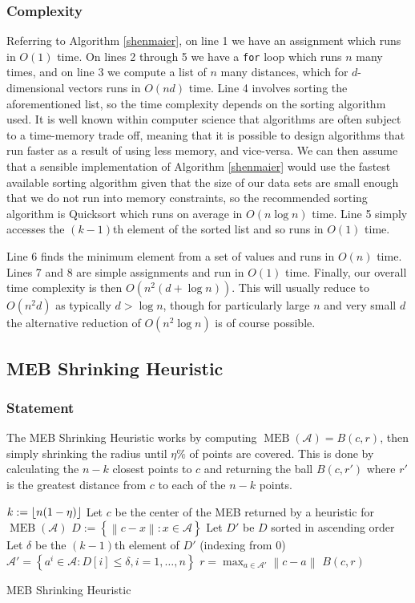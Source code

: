 \documentclass[11pt,twoside]{report}
\newcommand{\A}{\mathcal{A}} %
\newcommand{\norm}[1]{\left\lVert#1\right\rVert} %
\DeclareMathOperator{\MEB}{MEB}
\DeclarePairedDelimiter\floor{\lfloor}{\rfloor}
\theoremstyle{definition}
\numberwithin{theorem}{section}
\numberwithin{definition}{section}
\numberwithin{lemma}{section}
\numberwithin{proposition}{section}
\numberwithin{equation}{section}
\numberwithin{figure}{section}
\begin{document}
\subsubsection{Complexity}
Referring to Algorithm \ref{shenmaier}, on line 1 we have an assignment which runs in $O(1)$ time. On lines 2 through 5 we have a \texttt{for} loop which runs $n$ many times, and on line 3 we compute a list of $n$ many distances, which for $d$-dimensional vectors runs in $O(nd)$ time. Line 4 involves sorting the aforementioned list, so the time complexity depends on the sorting algorithm used. It is well known within computer science that algorithms are often subject to a time-memory trade off, meaning that it is possible to design algorithms that run faster as a result of using less memory, and vice-versa. We can then assume that a sensible implementation of Algorithm \ref{shenmaier} would use the fastest available sorting algorithm given that the size of our data sets are small enough that we do not run into memory constraints, so the recommended sorting algorithm is Quicksort \cite{hoare1962quicksort} which runs on average in $O(n\log n)$ time. Line 5 simply accesses the $(k-1)$th element of the sorted list and so runs in $O(1)$ time.

Line 6 finds the minimum element from a set of values and runs in $O(n)$ time. Lines 7 and 8 are simple assignments and run in $O(1)$ time. Finally, our overall time complexity is then $O(n^2(d+\log n))$. This will usually reduce to $O(n^2d)$ as typically $d>\log n$, though for particularly large $n$ and very small $d$ the alternative reduction of $O(n^2\log n)$ is of course possible.

\subsection{MEB Shrinking Heuristic}
\subsubsection{Statement}
The MEB Shrinking Heuristic works by computing $\MEB(\A) = B(c,r)$, then simply shrinking the radius until $\eta\%$ of points are covered. This is done by calculating the $n-k$ closest points to $c$ and returning the ball $B(c,r')$ where $r'$ is the greatest distance from $c$ to each of the $n-k$ points.

\begin{algorithm}[H]\label{meb shrink}
    \SetAlgoLined
    \KwIn{Data set $\A$, $\eta\in[0,1]$, $\epsilon>0$}
    $k:=\floor{n(1-\eta)}$\;
    Let $c$ be the center of the MEB returned by a heuristic for $\MEB(\A)$\;
    $D:=\left\{\norm{c-x}: x\in\A\right\}$\;
    Let $D'$ be $D$ sorted in ascending order\;
    Let $\delta$ be the $(k-1)$th element of $D'$ (indexing from 0)\;
    $\A' = \left\{a^i\in\A: D[i] \leq \delta, i=1,\ldots,n\right\}$\;
    $r = \max_{a\in\A'}\norm{c-a}$\;
    \KwRet $B(c,r)$\;
    
    \caption{MEB Shrinking Heuristic}
\end{algorithm}
\end{document}
